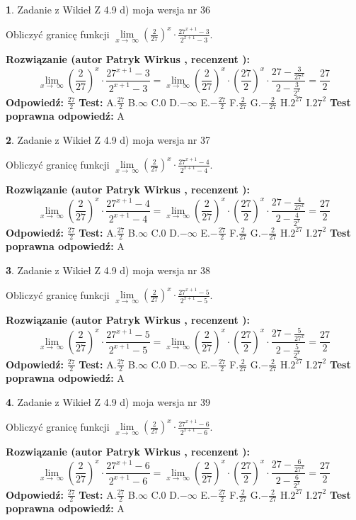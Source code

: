 \documentclass[12pt, a4paper]{article}
\theoremstyle{definition} %
\newtheorem{zad}{}
\newcommand{\zadStart}[1]{\begin{zad}#1\newline}
\newcommand{\zadStop}{\end{zad}}
\newcommand{\rozwStart}[2]{\noindent \textbf{Rozwiązanie (autor #1 , recenzent #2): }\newline}
\newcommand{\rozwStop}{\newline}
\newcommand{\odpStart}{\noindent \textbf{Odpowiedź:}\newline}
\newcommand{\odpStop}{\newline}
\newcommand{\testStart}{\noindent \textbf{Test:}\newline}
\newcommand{\testStop}{\newline}
\newcommand{\kluczStart}{\noindent \textbf{Test poprawna odpowiedź:}\newline}
\newcommand{\kluczStop}{\newline}
\begin{document}
\zadStart{Zadanie z Wikieł Z 4.9 d) moja wersja nr 36}


Obliczyć granicę funkcji  $\lim\limits_{x\to\ \infty}(\frac{2}{27})^{x}\cdot\frac{27^{x+1}-3}{2^{x+1}-3}$.
\zadStop
\rozwStart{Patryk Wirkus}{}
$$\lim\limits_{x\to\ \infty}(\frac{2}{27})^{x}\cdot\frac{27^{x+1}-3}{2^{x+1}-3}=\lim\limits_{x\to\ \infty}(\frac{2}{27})^{x}\cdot(\frac{27}{2})^{x} \cdot \frac{27-\frac{3}{27^{x}}}{2-\frac{3}{2^{x}}} = \frac{27}{2}$$
\rozwStop
\odpStart
$\frac{27}{2}$
\odpStop
\testStart
A.$\frac{27}{2}$ B.$\infty$ C.$0$ D.$-\infty$ E.$-\frac{27}{2}$
F.$\frac{2}{27}$ G.$-\frac{2}{27}$
H.$2^{27}$
I.$27^{2}$
\testStop
\kluczStart
A
\kluczStop



\zadStart{Zadanie z Wikieł Z 4.9 d) moja wersja nr 37}


Obliczyć granicę funkcji  $\lim\limits_{x\to\ \infty}(\frac{2}{27})^{x}\cdot\frac{27^{x+1}-4}{2^{x+1}-4}$.
\zadStop
\rozwStart{Patryk Wirkus}{}
$$\lim\limits_{x\to\ \infty}(\frac{2}{27})^{x}\cdot\frac{27^{x+1}-4}{2^{x+1}-4}=\lim\limits_{x\to\ \infty}(\frac{2}{27})^{x}\cdot(\frac{27}{2})^{x} \cdot \frac{27-\frac{4}{27^{x}}}{2-\frac{4}{2^{x}}} = \frac{27}{2}$$
\rozwStop
\odpStart
$\frac{27}{2}$
\odpStop
\testStart
A.$\frac{27}{2}$ B.$\infty$ C.$0$ D.$-\infty$ E.$-\frac{27}{2}$
F.$\frac{2}{27}$ G.$-\frac{2}{27}$
H.$2^{27}$
I.$27^{2}$
\testStop
\kluczStart
A
\kluczStop



\zadStart{Zadanie z Wikieł Z 4.9 d) moja wersja nr 38}


Obliczyć granicę funkcji  $\lim\limits_{x\to\ \infty}(\frac{2}{27})^{x}\cdot\frac{27^{x+1}-5}{2^{x+1}-5}$.
\zadStop
\rozwStart{Patryk Wirkus}{}
$$\lim\limits_{x\to\ \infty}(\frac{2}{27})^{x}\cdot\frac{27^{x+1}-5}{2^{x+1}-5}=\lim\limits_{x\to\ \infty}(\frac{2}{27})^{x}\cdot(\frac{27}{2})^{x} \cdot \frac{27-\frac{5}{27^{x}}}{2-\frac{5}{2^{x}}} = \frac{27}{2}$$
\rozwStop
\odpStart
$\frac{27}{2}$
\odpStop
\testStart
A.$\frac{27}{2}$ B.$\infty$ C.$0$ D.$-\infty$ E.$-\frac{27}{2}$
F.$\frac{2}{27}$ G.$-\frac{2}{27}$
H.$2^{27}$
I.$27^{2}$
\testStop
\kluczStart
A
\kluczStop



\zadStart{Zadanie z Wikieł Z 4.9 d) moja wersja nr 39}


Obliczyć granicę funkcji  $\lim\limits_{x\to\ \infty}(\frac{2}{27})^{x}\cdot\frac{27^{x+1}-6}{2^{x+1}-6}$.
\zadStop
\rozwStart{Patryk Wirkus}{}
$$\lim\limits_{x\to\ \infty}(\frac{2}{27})^{x}\cdot\frac{27^{x+1}-6}{2^{x+1}-6}=\lim\limits_{x\to\ \infty}(\frac{2}{27})^{x}\cdot(\frac{27}{2})^{x} \cdot \frac{27-\frac{6}{27^{x}}}{2-\frac{6}{2^{x}}} = \frac{27}{2}$$
\rozwStop
\odpStart
$\frac{27}{2}$
\odpStop
\testStart
A.$\frac{27}{2}$ B.$\infty$ C.$0$ D.$-\infty$ E.$-\frac{27}{2}$
F.$\frac{2}{27}$ G.$-\frac{2}{27}$
H.$2^{27}$
I.$27^{2}$
\testStop
\kluczStart
A
\kluczStop
\end{document}

